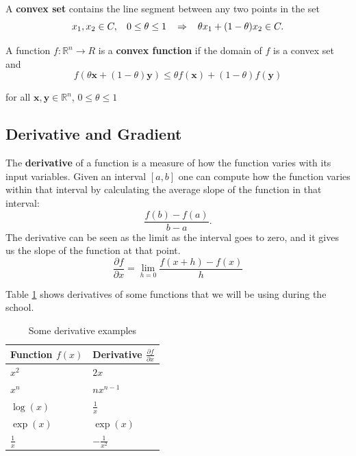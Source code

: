\vspace{0.1in}
\noindent A {\bf convex set} contains the line segment between any two points in the set 
\begin{equation*}
x_{1}, x_{2} \in C,\hspace{0.12in} 0 \leq \theta \leq 1 \hspace{0.12in} \Rightarrow \hspace{0.12in} \theta x_{1} + (1-\theta)x_{2} \in C.
\end{equation*}

\vspace{0.1in}
\noindent A function $f: \mathbb{R}^{n}\rightarrow R$ is a {\bf convex function} if the domain of $f$ is a convex set and 
\begin{equation*}
f(\theta \textbf{x} + (1-\theta) \textbf{y}) \leq \theta f(\textbf{x}) + (1-\theta) f(\textbf{y})
\end{equation*}

\noindent for all $\textbf{x},\textbf{y} \in \mathbb{R}^{n}$, $0 \leq \theta \leq 1$

\subsection{Derivative and Gradient}

The \textbf{derivative} of a function is a measure of how the function varies with its input variables. Given an interval $[a,b]$ one can compute how the function varies within that interval by calculating the average slope of the function in that interval: 
\begin{equation}
\frac{f(b) - f(a)}{b-a}.
\end{equation}
The derivative can be seen as the limit as the interval goes to zero, and it gives us the slope of the function at that point.
\begin{equation}
\frac {\partial f}{\partial x} = \lim_{h = 0} \frac{f(x+h) - f(x)}{h} 
\end{equation}

\noindent Table \ref{tb::derivatives} shows derivatives of some functions that we will be using during the school.

\begin{table}[!h]
\begin{center}
\begin{tabular}{|l|l|}
\hline
Function $f(x)$& Derivative $\frac{\partial f}{\partial x}$\\
\hline
$x^2$ & $2x$\\
\hline
$x^n$ & $nx^{n-1}$\\
\hline
$\log(x)$ & $\frac{1}{x}$\\
\hline
$\exp(x)$ & $\exp(x)$\\
\hline
$\frac{1}{x}$ & $-\frac{1}{x^{2}}$\\
\hline
\end{tabular}
\end{center}
\caption{\label{tb::derivatives}Some derivative examples}
\end{table}

